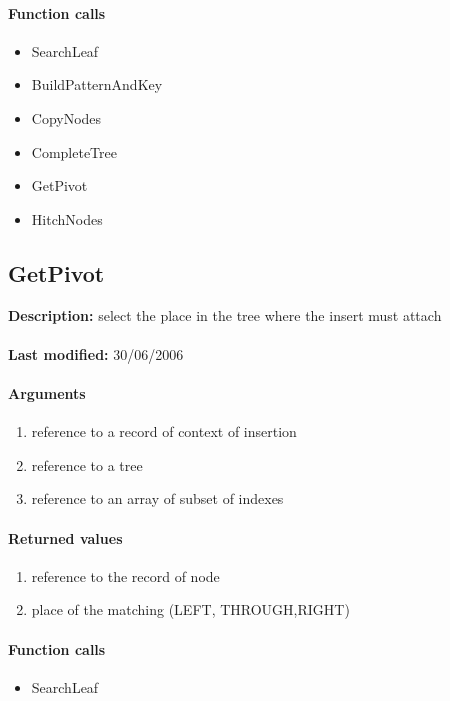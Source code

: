 \paragraph{Function calls}
\begin{itemize}
\item SearchLeaf
\item BuildPatternAndKey
\item CopyNodes
\item CompleteTree
\item GetPivot
\item HitchNodes
\end{itemize}

\subsection{GetPivot}
\textbf{Description:} select the place in the tree where the insert must attach\\
\\\textbf{Last modified:} 30/06/2006

\paragraph{Arguments}
\begin{enumerate}
\item reference to a record of context of insertion
\item reference to a tree
\item reference to an array of subset of indexes
\end{enumerate}

\paragraph{Returned values}
\begin{enumerate}
\item reference to the record of node
\item place of the matching (LEFT, THROUGH,RIGHT)
\end{enumerate}

\paragraph{Function calls}
\begin{itemize}
\item SearchLeaf
\end{itemize}

